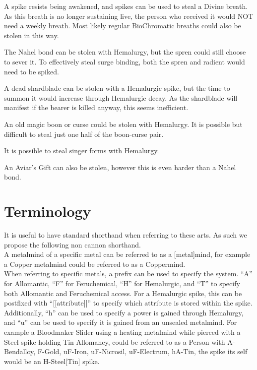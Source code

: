 \documentclass[conference]{IEEEtran}
\begin{document}
A spike resists being awakened,\cite{HE-awake} and spikes can be used to steal a Divine breath.\cite{HE-DB}  As this breath is no longer sustaining live, the person who received it would NOT need a weekly breath.\cite{HE-DB-life}  Most likely regular BioChromatic breaths could also be stolen in this way.\cite{PvAvI}

The Nahel bond can be stolen with Hemalurgy, but the spren could still choose to sever it.  To effectively steal surge binding, both the spren and radient would need to be spiked.\cite{HE-Aviar} 

A dead shardblade can be stolen with a Hemalurgic spike,\cite{HE-blade} but the time to summon it would increase through Hemalurgic decay.\cite{HE-blade}  As the shardblade will manifest if the bearer is killed anyway, this seems inefficient.

An old magic boon or curse could be stolen with Hemalurgy.  It is possible but difficult to steal just one half of the boon-curse pair.\cite{HE-Old}

It is possible to steal singer forms with Hemalurgy. \cite{HE-singer}

An Aviar's Gift can also be stolen, however this is even harder than a Nahel bond.\cite{HE-Aviar} 
\newpage
\section{\textbf{Terminology}}
It is useful to have standard shorthand when referring to these arts.  As such we propose the following non cannon shorthand.\\

A metalmind of a specific metal can be referred to as a [metal]mind, for example a Copper metalmind could be referred to as a Coppermind.\\

When referring to specific metals, a prefix can be used to specify the system.  ``A'' for Allomantic, ``F'' for Feruchemical, ``H'' for Hemalurgic, and ``T'' to specify both Allomantic and Feruchemical access.  For a Hemalurgic spike, this can be postfixed with ``[[attribute]]'' to specify which attribute is stored within the spike.  Additionally, ``h'' can be used to specify a power is gained through Hemalurgy, and ``u'' can be used to specify it is gained from an unsealed metalmind.  For example a Bloodmaker Slider using a heating metalmind while pierced with a Steel spike holding Tin Allomancy, could be referred to as a Person with A-Bendalloy, F-Gold, uF-Iron, uF-Nicrosil, uF-Electrum, hA-Tin, the spike its self would be an H-Steel[Tin] spike.  
\end{document}
